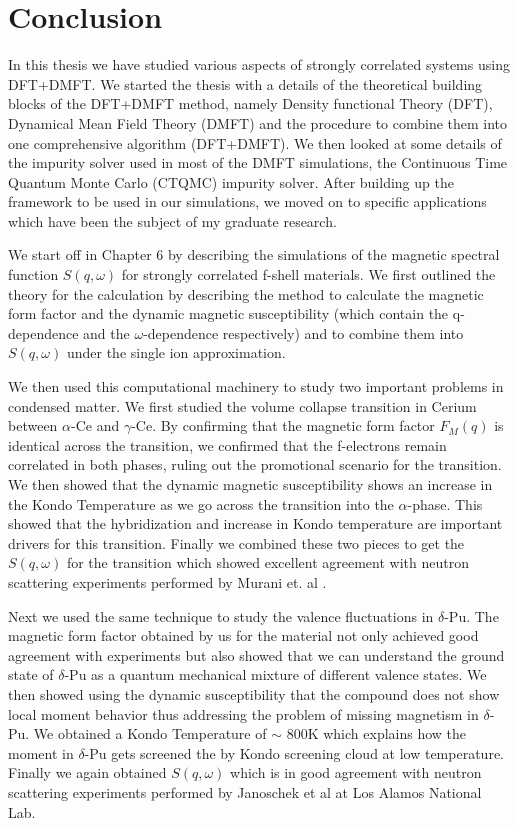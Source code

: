 \documentclass[10pt]{ruthesis}
\begin{document}
{\pagebreak
\chapter{Conclusion}

In this thesis we have studied various aspects of strongly correlated systems using DFT+DMFT. We started the thesis with a details of the theoretical building blocks of the DFT+DMFT method, namely Density functional Theory (DFT), Dynamical Mean Field Theory (DMFT) and the procedure to combine them into one comprehensive algorithm (DFT+DMFT). We then looked at some details of the impurity solver used in most of the DMFT simulations, the Continuous Time Quantum Monte Carlo (CTQMC) impurity solver. After building up the framework to be used in our simulations, we moved on to specific applications which have been the subject of my graduate research.

We start off in Chapter 6 by describing the simulations of the magnetic spectral function $S(q,\omega)$ for strongly correlated f-shell materials. We first outlined the theory for the calculation by describing the method to calculate the magnetic form factor and the dynamic magnetic susceptibility (which contain the q-dependence and the $\omega$-dependence respectively)  and to combine them into $S(q,\omega)$ under the single ion approximation. 

We then used this computational machinery to study two important problems in condensed matter. We first studied the volume collapse transition in Cerium between $\alpha$-Ce and $\gamma$-Ce. By confirming that the magnetic form factor $F_M(q)$ is identical across the transition, we confirmed that the f-electrons remain correlated in both phases, ruling out the promotional scenario for the transition. We then showed that the dynamic magnetic susceptibility shows an increase in the Kondo Temperature as we go across the transition into the $\alpha$-phase. This showed that the hybridization and  increase in Kondo temperature are important drivers for this transition. Finally we combined these two pieces to get the $S(q,\omega)$ for the transition which showed excellent agreement with neutron scattering experiments performed by Murani et. al \cite{murani}.

Next we used the same technique to study the valence fluctuations in $\delta$-Pu. The magnetic form factor obtained by us for the material not only achieved good agreement with experiments but also showed that we can understand the ground state of $\delta$-Pu as a quantum mechanical mixture of different valence states. We then showed using the dynamic susceptibility that the compound does not show local moment behavior thus addressing the problem of missing magnetism in $\delta$-Pu. We obtained a Kondo Temperature of $\sim$ 800K which explains how the moment in $\delta$-Pu gets screened the by Kondo screening cloud at low temperature. Finally we again obtained $S(q,\omega)$ which is in good agreement with neutron scattering experiments performed by Janoschek et al at Los Alamos National Lab.

}
\end{document}
